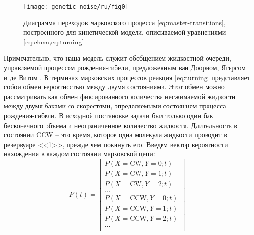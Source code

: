 \begin{figure}[ht]
    \centering
    \texttt{[image: genetic-noise/ru/fig0]}
    \caption{
        Диаграмма переходов марковского процесса \cref{eq:master-transitions}, построенного для кинетической модели, описываемой уравнениями \cref{eq:chem,eq:turning}
    }
    \label{fig:transitions}
\end{figure}

Примечательно, что наша модель служит обобщением жидкостной очереди, управляемой процессом рождения-гибели, предложенным ван Доорном, Ягерсом и де Витом \cite{van_doom_fluid_1988}. В терминах марковских процессов реакция \cref{eq:turning} представляет собой обмен вероятностью между двумя состояниями. Этот обмен можно рассматривать как обмен фиксированного количества несжимаемой жидкости между двумя баками со скоростями, определяемыми состоянием процесса рождения-гибели. В исходной постановке задачи был только один бак бесконечного объема и неограниченное количество жидкости. Длительность в состоянии CCW -- это время, которое одна молекула жидкости проводит в резервуаре <<1>>, прежде чем покинуть его. Введем вектор вероятности нахождения в каждом состоянии марковской цепи: 
\begin{equation}
    P(t) = \begin{bmatrix}
    P(X = \mathrm{CW}, Y = 0; t)\\
    P(X = \mathrm{CW}, Y = 1; t)\\
    P(X = \mathrm{CW}, Y = 2; t)\\
    ...\\
    P(X = \mathrm{CCW}, Y = 0; t)\\
    P(X = \mathrm{CCW}, Y = 1; t)\\
    P(X = \mathrm{CCW}, Y = 2; t)\\
    ...\\
    \end{bmatrix}
\label{eq:state-probs}
\end{equation}

